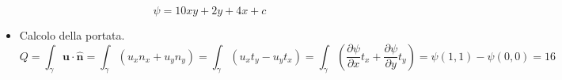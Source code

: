 \begin{itemize}
  \begin{equation}
    \psi = 10 xy + 2y + 4x + c
  \end{equation}
  
  \item Calcolo della portata.
  \begin{equation}
    Q = \int_{\gamma} \bm{u} \cdot \hat{\bm{n}} = \int_{\gamma} (u_x n_x + u_y n_y) = 
    \int_{\gamma} (u_x t_y - u_y t_x) = 
    \int_{\gamma} \displaystyle\left(\frac{\partial \psi}{\partial x} t_x + \frac{\partial \psi}{\partial y} t_y\right) = 
    \psi(1,1) - \psi(0,0) = 16
  \end{equation}

\end{itemize}


